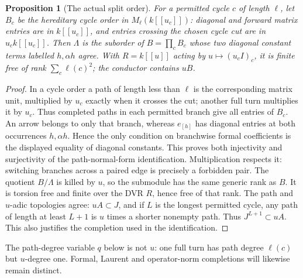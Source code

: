 \documentclass[11pt,oneside,openany]{book}
\newtheorem{proposition}[theorem]{Proposition}
\theoremstyle{definition}\newtheorem{definition}[theorem]{Definition}
\theoremstyle{remark}\newtheorem{remark}[theorem]{Remark}
\begin{document}
\begin{proposition}[The actual split order]\label{thm:order}
For a permitted cycle $c$ of length $\ell$, let $B_c$ be the hereditary cycle order in $M_\ell(k[[u_c]])$: diagonal and forward matrix entries are in $k[[u_c]]$, and entries crossing the chosen cycle cut are in $u_c k[[u_c]]$. Then $\Lambda$ is the suborder of $B=\prod_c B_c$ whose two diagonal constant terms labelled $h,\alpha h$ agree. With $R=k[[u]]$ acting by $u\mapsto(u_c I)_c$, it is finite free of rank $\sum_c\ell(c)^2$; the conductor contains $uB$.
\end{proposition}
\begin{proof}
In a cycle order a path of length less than $\ell$ is the corresponding matrix unit, multiplied by $u_c$ exactly when it crosses the cut; another full turn multiplies it by $u_c$. Thus completed paths in each permitted branch give all entries of $B_c$. An arrow belongs to only that branch, whereas $e_{[h]}$ has diagonal entries at both occurrences $h,\alpha h$. Hence the only condition on branchwise formal coefficients is the displayed equality of diagonal constants. This proves both injectivity and surjectivity of the path-normal-form identification. Multiplication respects it: switching branches across a paired edge is precisely a forbidden pair. The quotient $B/\Lambda$ is killed by $u$, so the submodule has the same generic rank as $B$. It is torsion free and finite over the DVR $R$, hence free of that rank. The path and $u$-adic topologies agree: $uA\subset J$, and if $L$ is the longest permitted cycle, any path of length at least $L+1$ is $u$ times a shorter nonempty path. Thus $J^{L+1}\subset uA$. This also justifies the completion used in the identification.
\end{proof}
The path-degree variable $q$ below is not $u$: one full turn has path degree $\ell(c)$ but $u$-degree one. Formal, Laurent and operator-norm completions will likewise remain distinct.
\end{document}
